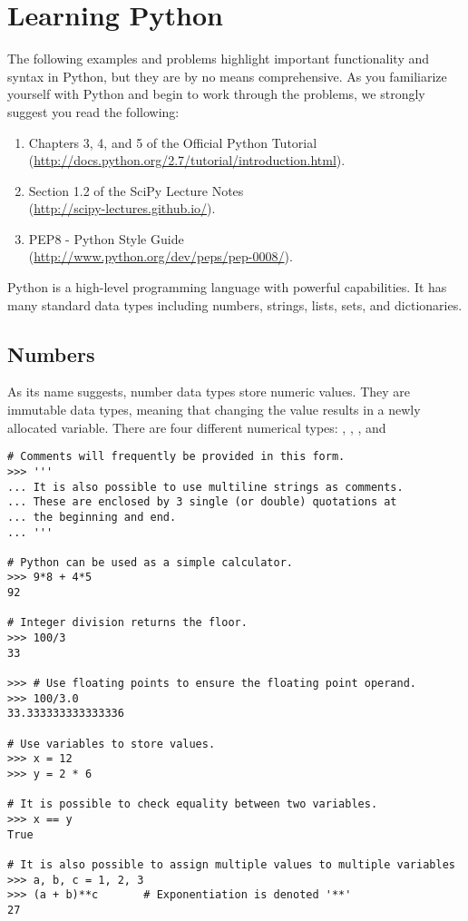 \section*{Learning Python}
The following examples and problems highlight important functionality and syntax in Python, but they are by no means comprehensive.  As you familiarize yourself with Python and begin to work through the problems, we strongly suggest you read the following:
\begin{enumerate}
\item Chapters 3, 4, and 5 of the Official Python Tutorial \\
        (\url{http://docs.python.org/2.7/tutorial/introduction.html}).
\item Section 1.2 of the SciPy Lecture Notes \\
        (\url{http://scipy-lectures.github.io/}).
\item PEP8 - Python Style Guide \\
        (\url{http://www.python.org/dev/peps/pep-0008/}).
\end{enumerate}

Python is a high-level programming language with powerful capabilities. 
It has many standard data types including numbers, strings, lists, sets, and dictionaries. 

\subsection*{Numbers}
\begin{example}
As its name suggests, number data types store numeric values. 
They are immutable data types, meaning that changing the value results in a 
newly allocated variable.
There are four different numerical types: , , 
, and 

\begin{lstlisting}
# Comments will frequently be provided in this form.
>>> '''
... It is also possible to use multiline strings as comments. 
... These are enclosed by 3 single (or double) quotations at 
... the beginning and end. 
... '''

# Python can be used as a simple calculator.
>>> 9*8 + 4*5
92

# Integer division returns the floor.
>>> 100/3
33

>>> # Use floating points to ensure the floating point operand.
>>> 100/3.0
33.333333333333336

# Use variables to store values.
>>> x = 12
>>> y = 2 * 6

# It is possible to check equality between two variables.
>>> x == y
True

# It is also possible to assign multiple values to multiple variables
>>> a, b, c = 1, 2, 3
>>> (a + b)**c       # Exponentiation is denoted '**'
27
\end{lstlisting}
\end{example}

